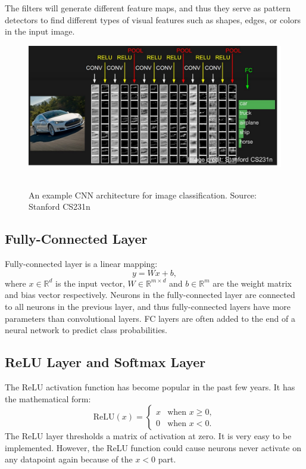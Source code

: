 The filters will generate different feature maps, and thus they serve as pattern detectors to find different types of visual features such as shapes, edges, or colors in the input image.

\begin{figure}
\begin{center}
\includegraphics[width=1\linewidth]{figures/convnet.pdf} \ \\
\end{center}
\caption{An example CNN architecture for image classification. Source: Stanford CS231n}
\label{dl:cls}
\end{figure}

\subsection{Fully-Connected Layer}
Fully-connected layer is a linear mapping:
\begin{equation}
  y=Wx+b,
\end{equation}
where $x\in\mathbb{R}^d$ is the input vector,  $W\in\mathbb{R}^{m\times d}$ and $b\in\mathbb{R}^m$ are the weight matrix and bias vector respectively. Neurons in the fully-connected layer are connected to all neurons in the previous layer, and thus fully-connected layers have more parameters than convolutional layers. FC layers are often added to the end of a neural network to predict class probabilities.

\subsection{ReLU Layer and Softmax Layer}
The ReLU activation function has become popular in the past few years. It has the mathematical form:
\begin{equation}
  \mathrm{ReLU}(x) = \begin{cases}
    x & \text{when }x \ge 0,\\
    0 & \text{when }x < 0.
  \end{cases}
\end{equation}
The ReLU layer thresholds a matrix of activation at zero. It is very easy to be implemented. However, the ReLU function could cause neurons never activate on any datapoint again because of the $x<0$ part. 

